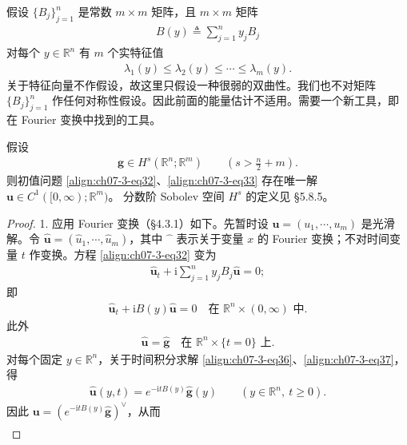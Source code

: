 \documentclass[../../main.tex]{subfiles}
\begin{document}
假设 $\{B_j\}_{j=1}^n$ 是常数 $m\times m$ 矩阵，且 $m\times m$ 矩阵
\begin{align}
B(y)\triangleq\sum_{j=1}^n y_jB_j\label{align:ch07-3-eq34}
\end{align}
对每个 $y\in\mathbb{R}^n$ 有 $m$ 个实特征值
\begin{align}
\lambda_1(y)\leqslant\lambda_2(y)\leqslant\cdots\leqslant\lambda_m(y).\label{align:ch07-3-eq35}
\end{align}
关于特征向量不作假设，故这里只假设一种很弱的双曲性。我们也不对矩阵 $\{B_j\}_{j=1}^n$ 作任何对称性假设。因此前面的能量估计不适用。需要一个新工具，即在 Fourier 变换中找到的工具。

\begin{theorem}[解的存在性]\label{theorem:ch07-3-5-常系数解存在}
假设
\begin{align*}
\mathbf{g}\in H^s(\mathbb{R}^n;\mathbb{R}^m)\qquad\left(s>\frac n2+m\right).
\end{align*}
则初值问题 \eqref{align:ch07-3-eq32}、\eqref{align:ch07-3-eq33} 存在唯一解 $\mathbf{u}\in C^1([0,\infty);\mathbb{R}^m)$。
分数阶 Sobolev 空间 $H^s$ 的定义见 \S5.8.5。
\begin{proof}
1. 应用 Fourier 变换（\S4.3.1）如下。先暂时设 $\mathbf{u}=(u_1,\cdots,u_m)$ 是光滑解。令 $\widehat{\mathbf{u}}=(\widehat{u}_1,\cdots,\widehat{u}_m)$，其中 $\widehat{\phantom{u}}$ 表示关于变量 $x$ 的 Fourier 变换；不对时间变量 $t$ 作变换。方程 \eqref{align:ch07-3-eq32} 变为
\begin{align*}
\widehat{\mathbf{u}}_t+\mathrm{i}\sum_{j=1}^n y_jB_j\widehat{\mathbf{u}}=0;
\end{align*}
即
\begin{align}
\widehat{\mathbf{u}}_t+\mathrm{i}B(y)\widehat{\mathbf{u}}=0\quad\text{在 }\mathbb{R}^n\times(0,\infty)\text{ 中}.\label{align:ch07-3-eq36}
\end{align}
此外
\begin{align}
\widehat{\mathbf{u}}=\widehat{\mathbf{g}}\quad\text{在 }\mathbb{R}^n\times\{t=0\}\text{ 上}.\label{align:ch07-3-eq37}
\end{align}
对每个固定 $y\in\mathbb{R}^n$，关于时间积分求解 \eqref{align:ch07-3-eq36}、\eqref{align:ch07-3-eq37}，得
\begin{align}
\widehat{\mathbf{u}}(y,t)=e^{-\mathrm{i}tB(y)}\widehat{\mathbf{g}}(y)\qquad (y\in\mathbb{R}^n,\ t\geqslant 0).\label{align:ch07-3-eq38}
\end{align}
因此 $\mathbf{u}=(e^{-\mathrm{i}tB(y)}\widehat{\mathbf{g}})^\vee$，从而
\begin{align}

\end{align}
\end{proof}
\end{theorem}
\end{document}

